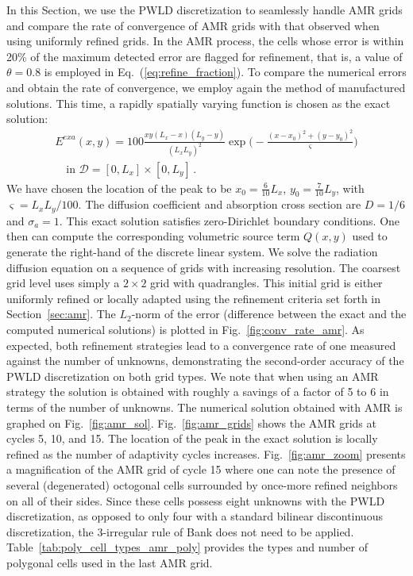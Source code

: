 \documentclass[preprint,10pt]{elsarticle}
\newcommand{\D}{\mathcal{D}}
\newcommand{\eqt}[1]{Eq.~(\ref{#1})}                     %
\newcommand{\fig}[1]{Fig.~\ref{#1}}                      %
\newcommand{\tbl}[1]{Table~\ref{#1}}                     %
\newcommand{\sct}[1]{Section~\ref{#1}}                   %
\begin{document}
In this Section, we use the PWLD discretization to seamlessly handle AMR grids and compare the rate
of convergence of AMR grids with that observed when using uniformly refined grids. In the AMR process, the cells whose
error is within 20\% of the maximum detected error are flagged for refinement, that is, a value of 
$\theta=0.8$ is employed in \eqt{eq:refine_fraction}.
To compare the numerical errors and obtain the rate of convergence, we employ again the method of 
manufactured solutions. This time, a rapidly spatially varying function is chosen
as the exact solution:
%
\begin{multline}
	E^{\textit{exa}}(x,y) = 100 \frac{xy(L_x-x)(L_y-y)}{(L_x L_y)^2}\exp\Big(-\frac{(x-x_0)^2+(y-y_0)^2}{\varsigma}\Big) \\
	 \quad \text{in } \D=[0,L_x]\times [0,L_y] \,.
\end{multline}
%
We have chosen the location of the peak to be $x_0=\tfrac{6}{10}L_x$, $y_0=\tfrac{7}{10}L_y$, with $\varsigma=L_xL_y/100$. 
The diffusion coefficient and absorption cross section are  $D=1/6$ and $\sigma_a=1$. 
This exact solution satisfies zero-Dirichlet boundary conditions. One then can compute 
the corresponding volumetric source term $Q(x,y)$ used to generate the right-hand of the discrete linear system. 
We solve the radiation diffusion equation on a sequence of grids with increasing resolution. The coarsest grid level
uses simply a $2\times 2$ grid with quadrangles. This initial grid is either uniformly refined or locally adapted 
using the refinement criteria set forth in \sct{sec:amr}. The $L_2$-norm of the error (difference
between the exact and the computed numerical solutions) is plotted in \fig{fig:conv_rate_amr}. As expected, both refinement
strategies lead to a convergence rate of one measured against the number of unknowns, demonstrating the 
second-order accuracy of the PWLD discretization on both grid types. We note that when using an AMR strategy 
the solution is obtained with roughly a savings of
a factor of 5 to 6 in terms of the number of unknowns. 
The numerical solution obtained with AMR is graphed on \fig{fig:amr_sol}.
\fig{fig:amr_grids} shows the AMR grids at cycles 5, 10, and 15. The location of the peak in the exact solution is
locally refined as the number of adaptivity cycles increases. \fig{fig:amr_zoom} presents a magnification of the AMR grid of cycle 15
where one can note the presence of several (degenerated) octogonal cells surrounded by once-more refined neighbors on all 
of their sides. Since these cells possess eight unknowns with the PWLD discretization, as opposed to
only four with a standard bilinear discontinuous discretization, the 3-irregular rule of Bank does not need to be applied.
\tbl{tab:poly_cell_types_amr_poly} provides the types and number of polygonal cells used in the last AMR grid.
 
\end{document}
